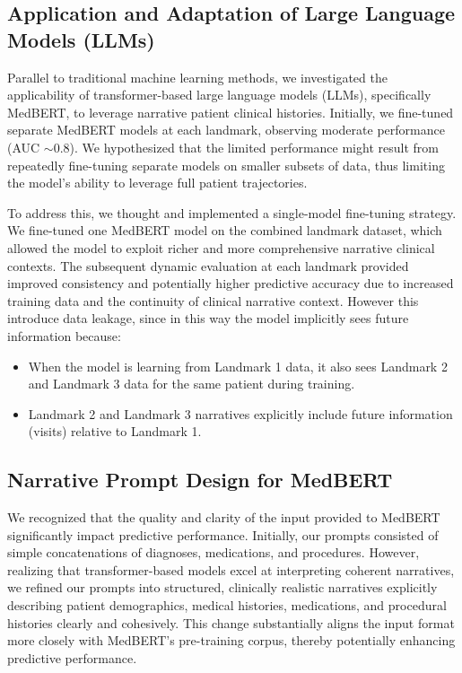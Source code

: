 \subsection{Application and Adaptation of Large Language Models (LLMs)}
Parallel to traditional machine learning methods, we investigated the applicability of transformer-based large language models (LLMs), 
specifically MedBERT, to leverage narrative patient clinical histories. Initially, we fine-tuned separate MedBERT models at each landmark, 
observing moderate performance (AUC $\sim$0.8). We hypothesized that the limited performance might result from repeatedly fine-tuning separate 
models on smaller subsets of data, thus limiting the model's ability to leverage full patient trajectories.

To address this, we thought and implemented a single-model fine-tuning strategy. We fine-tuned one MedBERT model on the combined landmark dataset, 
which allowed the model to exploit richer and more comprehensive narrative clinical contexts. The subsequent dynamic evaluation at each landmark 
provided improved consistency and potentially higher predictive accuracy due to increased training data and the continuity of clinical narrative context. 
However this introduce data leakage, since in this way the model implicitly sees future information because:
\begin{itemize}
    \item When the model is learning from Landmark 1 data, it also sees Landmark 2 and Landmark 3 data for the same patient during training.
    \item Landmark 2 and Landmark 3 narratives explicitly include future information (visits) relative to Landmark 1.
\end{itemize}

\subsection{Narrative Prompt Design for MedBERT}
We recognized that the quality and clarity of the input provided to MedBERT significantly impact predictive performance. 
Initially, our prompts consisted of simple concatenations of diagnoses, medications, and procedures. However, realizing that 
transformer-based models excel at interpreting coherent narratives, we refined our prompts into structured, clinically realistic 
narratives explicitly describing patient demographics, medical histories, medications, and procedural histories clearly and cohesively. 
This change substantially aligns the input format more closely with MedBERT's pre-training corpus, thereby potentially enhancing predictive performance.

